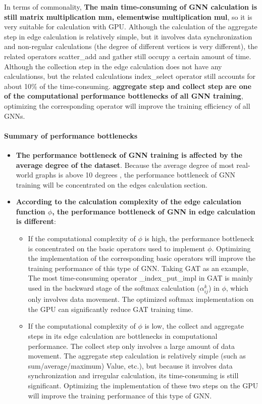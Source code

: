 In terms of commonality,
\textbf{The main time-consuming of GNN calculation is still matrix multiplication mm, elementwise multiplication mul},
so it is very suitable for calculation with GPU. Although the calculation of the aggregate step in edge calculation is relatively simple,
but it involves data synchronization and non-regular calculations (the degree of different vertices is very different),
the related operators scatter\_add and gather still occupy a certain amount of time.
Although the collection step in the edge calculation does not have any calculationss,
but the related calculations index\_select operator still accounts for about 10\% of the time-consuming.
\textbf{aggregate step and collect step are one of the computational performance bottlenecks of all GNN training},
optimizing the corresponding operator will improve the training efficiency of all GNNs.

\paragraph{Summary of performance bottlenecks}

\begin{itemize}
    \item \textbf{The performance bottleneck of GNN training is affected by the average degree of the dataset}.
          Because the average degree of most real-world graphs is above 10 degrees \cite{network-repository},
          the performance bottleneck of GNN training will be concentrated on the edges calculation section.
    \item \textbf{According to the calculation complexity of the edge calculation function $\phi$, the performance bottleneck of GNN in edge calculation is different}:
          \begin{itemize}
              \item If the computational complexity of $\phi$ is high, the performance bottleneck is concentrated on the basic operators used to implement $\phi$.
                    Optimizing the implementation of the corresponding basic operators will improve the training performance of this type of GNN.
                    Taking GAT as an example, The most time-consuming operator \_index\_put\_impl in GAT is mainly used in the backward stage of the softmax calculation ($\alpha^k_{ij}$) in $\phi$,
                    which only involves data movement.
                    The optimized softmax implementation on the GPU can significantly reduce GAT training time.
              \item If the computational complexity of $\phi$ is low, the collect and aggregate steps in its edge calculation are bottlenecks in computational performance. The collect step only involves a large amount of data movement. The aggregate step calculation is relatively simple (such as sum/average/maximum) Value, etc.), but because it involves data synchronization and irregular calculation, its time-consuming is still significant.
                    Optimizing the implementation of these two steps on the GPU will improve the training performance of this type of GNN.
          \end{itemize}
\end{itemize}


